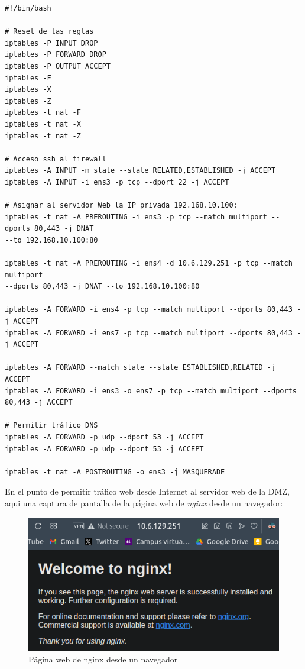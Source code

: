 \documentclass[11pt]{report} %
\begin{document}
\begin{verbatim}
#!/bin/bash

# Reset de las reglas
iptables -P INPUT DROP
iptables -P FORWARD DROP
iptables -P OUTPUT ACCEPT
iptables -F
iptables -X
iptables -Z
iptables -t nat -F
iptables -t nat -X
iptables -t nat -Z

# Acceso ssh al firewall
iptables -A INPUT -m state --state RELATED,ESTABLISHED -j ACCEPT
iptables -A INPUT -i ens3 -p tcp --dport 22 -j ACCEPT

# Asignar al servidor Web la IP privada 192.168.10.100:
iptables -t nat -A PREROUTING -i ens3 -p tcp --match multiport --dports 80,443 -j DNAT 
--to 192.168.10.100:80

iptables -t nat -A PREROUTING -i ens4 -d 10.6.129.251 -p tcp --match multiport 
--dports 80,443 -j DNAT --to 192.168.10.100:80

iptables -A FORWARD -i ens4 -p tcp --match multiport --dports 80,443 -j ACCEPT
iptables -A FORWARD -i ens7 -p tcp --match multiport --dports 80,443 -j ACCEPT

iptables -A FORWARD --match state --state ESTABLISHED,RELATED -j ACCEPT
iptables -A FORWARD -i ens3 -o ens7 -p tcp --match multiport --dports 80,443 -j ACCEPT

# Permitir tráfico DNS
iptables -A FORWARD -p udp --dport 53 -j ACCEPT
iptables -A FORWARD -p udp --dport 53 -j ACCEPT

iptables -t nat -A POSTROUTING -o ens3 -j MASQUERADE
\end{verbatim}

\cleardoublepage

En el punto de permitir tráfico web desde Internet al servidor web de la DMZ, aqui una captura de pantalla de la
página web de \emph{nginx} desde un navegador:

\begin{figure}[H]
  \centering
  \includegraphics[scale=0.55]{img/nginx_navegador.png}
  \caption{Página web de nginx desde un navegador}
  \label{fig:página web de nginx desde un navegador}
\end{figure}
\end{document}
